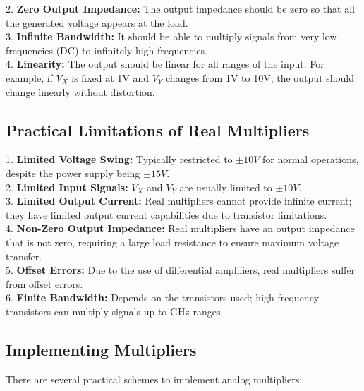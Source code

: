 \documentclass[a4paper,9pt,twoside,openany,twocolumn]{memoir}
\begin{document}
2. \textbf{Zero Output Impedance:} The output impedance should be zero so that all the generated voltage appears at the load.\\

3. \textbf{Infinite Bandwidth:} It should be able to multiply signals from very low frequencies (DC) to infinitely high frequencies.\\

4. \textbf{Linearity:} The output should be linear for all ranges of the input. For example, if $V_X$ is fixed at 1V and $V_Y$ changes from 1V to 10V, the output should change linearly without distortion.


\subsection*{Practical Limitations of Real Multipliers}

1. \textbf{Limited Voltage Swing:} Typically restricted to $\pm 10V$ for normal operations, despite the power supply being $\pm 15V$.\\

2. \textbf{Limited Input Signals:} $V_X$ and $V_Y$ are usually limited to $\pm 10V$.\\

3. \textbf{Limited Output Current:} Real multipliers cannot provide infinite current; they have limited output current capabilities due to transistor limitations.\\

4. \textbf{Non-Zero Output Impedance:} Real multipliers have an output impedance that is not zero, requiring a large load resistance to ensure maximum voltage transfer.\\

5. \textbf{Offset Errors:} Due to the use of differential amplifiers, real multipliers suffer from offset errors.\\

6. \textbf{Finite Bandwidth:} Depends on the transistors used; high-frequency transistors can multiply signals up to GHz ranges.

\subsection*{Implementing Multipliers}

There are several practical schemes to implement analog multipliers:
\end{document}
